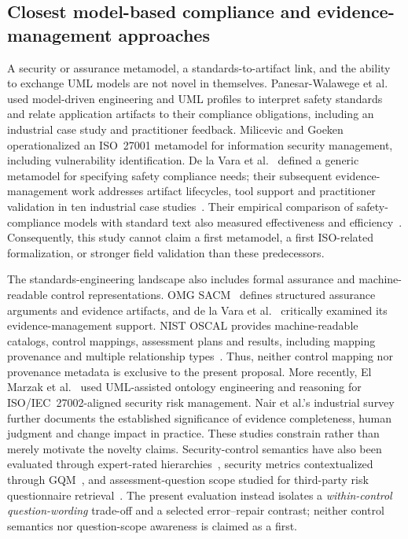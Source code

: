 \documentclass[12pt,a4paper]{article}
\begin{document}
\subsection{Closest model-based compliance and evidence-management approaches}
A security or assurance metamodel, a standards-to-artifact link, and the ability to exchange UML models are not novel in themselves. Panesar-Walawege et al.~\cite{PanesarWalawege2013IST} used model-driven engineering and UML profiles to interpret safety standards and relate application artifacts to their compliance obligations, including an industrial case study and practitioner feedback. Milicevic and Goeken~\cite{MilicevicGoeken2011} operationalized an ISO~27001 metamodel for information security management, including vulnerability identification. De la Vara et al.~\cite{DelaVara2016IST} defined a generic metamodel for specifying safety compliance needs; their subsequent evidence-management work addresses artifact lifecycles, tool support and practitioner validation in ten industrial case studies~\cite{DelaVara2022SoSyM}. Their empirical comparison of safety-compliance models with standard text also measured effectiveness and efficiency~\cite{DelaVara2020IST}. Consequently, this study cannot claim a first metamodel, a first ISO-related formalization, or stronger field validation than these predecessors.

The standards-engineering landscape also includes formal assurance and machine-readable control representations. OMG SACM~\cite{OMG_SACM23} defines structured assurance arguments and evidence artifacts, and de la Vara et al.~\cite{DelaVara2017SACM} critically examined its evidence-management support. NIST OSCAL provides machine-readable catalogs, control mappings, assessment plans and results, including mapping provenance and multiple relationship types~\cite{NIST_OSCAL_2026,NIST_OSCAL_ControlMapping_Online}. Thus, neither control mapping nor provenance metadata is exclusive to the present proposal. More recently, El Marzak et al.~\cite{ElMarzak2026} used UML-assisted ontology engineering and reasoning for ISO/IEC~27002-aligned security risk management. Nair et al.'s industrial survey~\cite{Nair2015IST} further documents the established significance of evidence completeness, human judgment and change impact in practice. These studies constrain rather than merely motivate the novelty claims. Security-control semantics have also been evaluated through expert-rated hierarchies~\cite{HaleGamble2019SecurityHierarchy}, security metrics contextualized through GQM~\cite{Philippou2020Symbiosis}, and assessment-question scope studied for third-party risk questionnaire retrieval~\cite{NourEldin2026QuestionScope}. The present evaluation instead isolates a \emph{within-control question-wording} trade-off and a selected error--repair contrast; neither control semantics nor question-scope awareness is claimed as a first.
\end{document}
